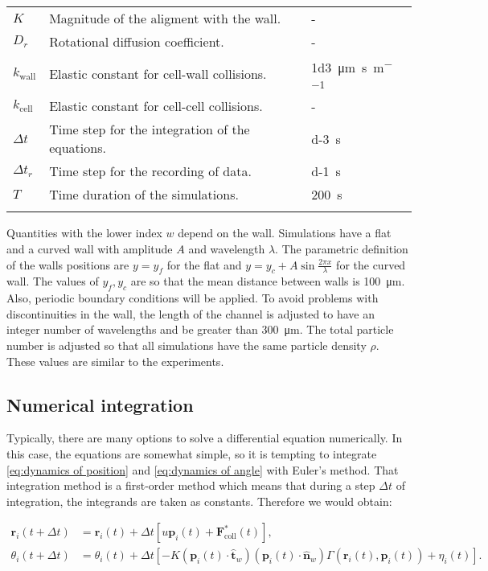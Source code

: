 \begin{table}[!h]
\begin{tabularx}{\textwidth}{lXl}
         $K$ & Magnitude of the aligment with the wall. & - \\ 
         $D_r$ & Rotational diffusion coefficient. & - \\ 
         $k_{\text{wall}}$ & Elastic constant for cell-wall collisions. & \SI[per-mode = symbol]{1d3}{\micro\meter\per\second\per\meter}\\ 
         $k_{\text{cell}}$ & Elastic constant for cell-cell collisions. & - \\
         $\Delta t$ & Time step for the integration of the equations. & \SI{d-3}{\second} \\
         $\Delta t_r$ & Time step for the recording of data. & \SI{d-1}{\second} \\
         $T$ & Time duration of the simulations. & \SI{200}{\second} \\
    \hline\noalign{\smallskip}
    \end{tabularx}
    \label{table:model parameters}
\end{table}

Quantities with the lower index $w$ depend on the wall. Simulations have a flat and a curved wall with amplitude $A$ and wavelength $\lambda$. The parametric definition of the walls positions are $y=y_f$ for the flat and $y=y_c+A\sin{\frac{2\pi x}{\lambda}}$ for the curved wall. The values of $y_f, y_c$ are so that the mean distance between walls is \SI{100}{\micro\meter}. Also, periodic boundary conditions will be applied. To avoid problems with discontinuities in the wall, the length of the channel is adjusted to have an integer number of wavelengths and be greater than \SI{300}{\micro\meter}. The total particle number is adjusted so that all simulations have the same particle density $\rho$. These values are similar to the experiments.

\subsection{Numerical integration}

Typically, there are many options to solve a differential equation numerically. In this case, the equations are somewhat simple, so it is tempting to integrate \eqref{eq:dynamics of position} and \eqref{eq:dynamics of angle} with Euler's method. That integration method is a first-order method which means that during a step $\Delta t$ of integration, the integrands are taken as constants. Therefore we would obtain:

\begin{align}
    \textbf{r}_i(t+\Delta t) &=  \textbf{r}_i(t) + \Delta t[u \textbf{p}_i(t) + \textbf{F}^*_{\text{coll}}(t)], \\
    \label{eq:wrong integration}
    \theta_i(t+\Delta t) &=  \theta_i(t) + \Delta t[- K (\textbf{p}_i(t) \cdot \hat{\textbf{t}}_w)  (\textbf{p}_i(t) \cdot \hat{\textbf{n}}_w) \Gamma(\textbf{r}_i(t), \textbf{p}_i(t)) + \eta_i(t)].
\end{align}

